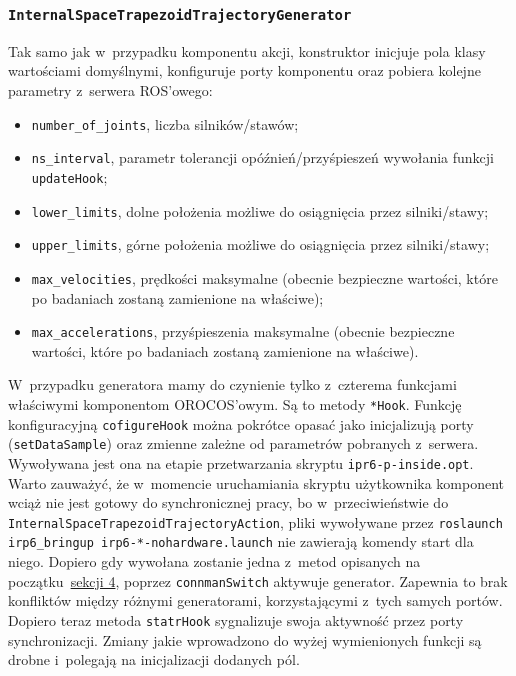 \documentclass[a4paper, 12pt]{article}
\begin{document}
	\subsubsection{\texttt{InternalSpaceTrapezoidTrajectoryGenerator}}
	Tak samo jak w~przypadku komponentu akcji, konstruktor inicjuje pola klasy wartościami domyślnymi, konfiguruje porty komponentu oraz pobiera kolejne parametry z~serwera ROS'owego:
	\begin{itemize}
	\item \texttt{number\_of\_joints}, liczba silników/stawów;
	\item \texttt{ns\_interval}, parametr tolerancji opóźnień/przyśpieszeń wywołania funkcji \texttt{updateHook};
	\item \texttt{lower\_limits}, dolne położenia możliwe do osiągnięcia przez silniki/stawy;
	\item \texttt{upper\_limits}, górne położenia możliwe do osiągnięcia przez silniki/stawy;
	\item \texttt{max\_velocities}, prędkości maksymalne (obecnie bezpieczne wartości, które po badaniach zostaną zamienione na właściwe);
	\item \texttt{max\_accelerations}, przyśpieszenia maksymalne (obecnie bezpieczne wartości, które po badaniach zostaną zamienione na właściwe).
	\end{itemize}
	\par W~przypadku generatora mamy do czynienie tylko z~czterema funkcjami właściwymi komponentom OROCOS'owym. Są to metody \texttt{*Hook}. Funkcję konfiguracyjną \texttt{cofigureHook} można pokrótce opasać jako inicjalizują porty (\texttt{setDataSample}) oraz zmienne zależne od parametrów pobranych z~serwera. Wywoływana jest ona na etapie przetwarzania skryptu \linebreak\texttt{ipr6-p-inside.opt}. Warto zauważyć, że w~momencie uruchamiania skryptu użytkownika komponent wciąż nie jest gotowy do synchronicznej pracy, bo w~przeciwieństwie do \linebreak\texttt{InternalSpaceTrapezoidTrajectoryAction}, pliki wywoływane przez \texttt{roslaunch \linebreak irp6\_bringup irp6-*-nohardware.launch} nie zawierają komendy start dla niego. Dopiero gdy wywołana zostanie jedna z~metod opisanych na początku~\hyperref[sec:api]{sekcji 4}, poprzez \texttt{connmanSwitch} aktywuje generator. Zapewnia to brak konfliktów między różnymi generatorami, korzystającymi z~tych samych portów. Dopiero teraz metoda \texttt{statrHook} sygnalizuje swoja aktywność przez porty synchronizacji. Zmiany jakie wprowadzono do wyżej wymienionych funkcji są drobne i~polegają na inicjalizacji dodanych pól. 
\end{document}
